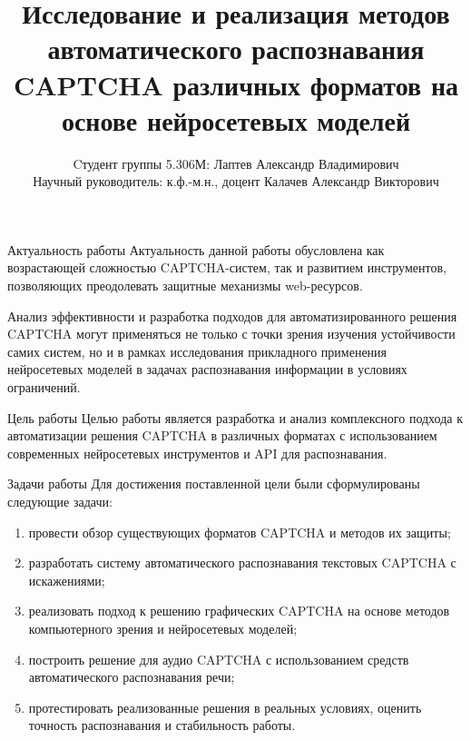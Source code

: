 \documentclass[12pt,a4paper,mathserif]{beamer}
\author[Лаптев А.В.]{{Cтудент группы 5.306М: Лаптев Александр Владимирович}\\
{Научный руководитель: к.ф.-м.н., доцент Калачев Александр Викторович}}
\title[Барнаул 2025]{\large Исследование и реализация методов автоматического распознавания CAPTCHA различных форматов на основе нейросетевых моделей}
\begin{document}
\begin{frame}
\maketitle
\end{frame}

\begin{frame}{Актуальность работы}
    \setlength{\parindent}{0.5cm}
    Актуальность данной работы обусловлена как возрастающей сложностью 
    CAPTCHA-систем, так и развитием инструментов, позволяющих преодолевать 
    защитные механизмы web-ресурсов.
    
    Анализ эффективности и разработка подходов для автоматизированного решения 
    CAPTCHA могут применяться не только с точки зрения изучения устойчивости 
    самих систем, но и в рамках исследования прикладного применения нейросетевых 
    моделей в задачах распознавания информации в условиях ограничений.
\end{frame}

\begin{frame}{Цель работы}
    \setlength{\parindent}{0.5cm}
    Целью работы является разработка и анализ комплексного подхода к 
    автоматизации решения CAPTCHA в различных форматах с использованием 
    современных нейросетевых инструментов и API для распознавания.
\end{frame}

\begin{frame}{Задачи работы}
    \setlength{\parindent}{0.5cm}
    Для достижения поставленной цели были сформулированы следующие задачи:

    \begin{enumerate}
        \item провести обзор существующих форматов CAPTCHA и методов их защиты;
        \item разработать систему автоматического распознавания текстовых CAPTCHA с 
        искажениями;
        \item реализовать подход к решению графических CAPTCHA на основе методов 
        компьютерного зрения и нейросетевых моделей;
        \item построить решение для аудио CAPTCHA с использованием средств 
        автоматического распознавания речи;
        \item протестировать реализованные решения в реальных условиях, оценить 
        точность распознавания и стабильность работы.
    \end{enumerate}
\end{frame}
\end{document}
